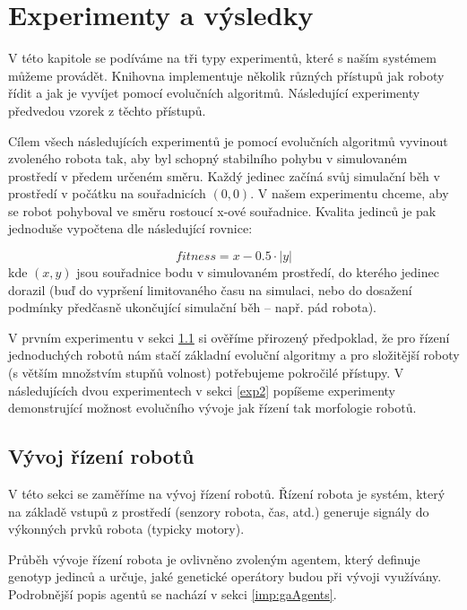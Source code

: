 \chapter{Experimenty a výsledky} \label{chapter-experimenty}

V této kapitole se podíváme na tři typy experimentů, které s naším systémem
můžeme provádět. Knihovna implementuje několik různých přístupů jak roboty
řídit a jak je vyvíjet pomocí evolučních algoritmů. Následující experimenty
předvedou vzorek z těchto přístupů. 

Cílem všech následujících experimentů je pomocí evolučních algoritmů vyvinout
zvoleného robota tak, aby byl schopný stabilního pohybu v simulovaném prostředí
v předem určeném směru. Každý jedinec začíná svůj simulační běh v prostředí v
počátku na souřadnicích $(0,0)$. V našem experimentu chceme, aby se robot
pohyboval ve směru rostoucí x-ové souřadnice. Kvalita jedinců je pak jednoduše
vypočtena dle následující rovnice:

\begin{equation} \label{fitness_calc}
    fitness = x - 0.5\cdot|y|
\end{equation}
kde $(x,y)$ jsou souřadnice bodu v simulovaném prostředí, do kterého jedinec
dorazil (buď do vypršení limitovaného času na simulaci, nebo do dosažení
podmínky předčasně ukončující simulační běh -- např. pád robota).

V prvním experimentu v sekci \ref{exp1} si ověříme přirozený předpoklad, že pro
řízení jednoduchých robotů nám stačí základní evoluční algoritmy a pro
složitější roboty (s větším množstvím stupňů volnost) potřebujeme pokročilé
přístupy. V následujících dvou experimentech v sekci \ref{exp2} popíšeme
experimenty demonstrující možnost evolučního vývoje jak řízení tak morfologie
robotů.

\section{Vývoj řízení robotů} \label{exp1}

V této sekci se zaměříme na vývoj řízení robotů. Řízení robota je systém,
který na základě vstupů z prostředí (senzory robota, čas, atd.) generuje
signály do výkonných prvků robota (typicky motory). 

Průběh vývoje řízení robota je ovlivněno zvoleným agentem, který definuje
genotyp jedinců a určuje, jaké genetické operátory budou při vývoji využívány.
Podrobnější popis agentů se nachází v sekci \ref{imp:gaAgents}.

